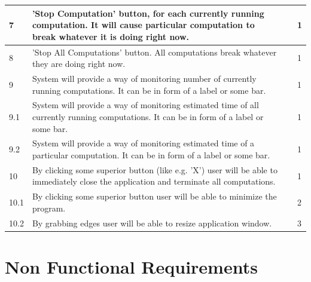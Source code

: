 \documentclass{article}
\begin{document}
\begin{center}
\begin{longtable}{| l | p{4cm} | p{3.5cm} | l |}
		7 & 
		'Stop Computation' button, for each currently running computation. It will cause 				particular computation to break whatever it is doing right now. & 
		 &
		1
		\\ \hline	
		
		8 & 
		'Stop All Computations' button. All computations break whatever they are doing right 			now. & 
		 &
		1
		\\ \hline		
		
		9 & 
		System will provide a way of monitoring number of currently running computations. It 			can be in form of a label or some bar. & 
		 &
		1
		\\ \hline	

		9.1 & 
		System will provide a way of monitoring estimated time of all currently running 				computations. It can be in form of a label or some bar. & 
		 &
		1
		\\ \hline

		9.2 & 
		System will provide a way of monitoring estimated time of a particular computation. It 			can be in form of a label or some bar. & 
		 &
		1
		\\ \hline

		10 & 
		By clicking some superior button (like e.g. 'X') user will be able to immediately 				close the application and terminate all computations.  & 
		 &
		1
		\\ \hline
	
		10.1 & 
		By clicking some superior button user will be able to minimize the program. & 
		 &
		2
		\\ \hline	

		10.2 & 
		By grabbing edges user will be able to resize application window. & 
		 &
		3
		\\ \hline
		
	\end{longtable}
\end{center}	



\newpage

%
%
\section{Non Functional Requirements}

\end{document}
